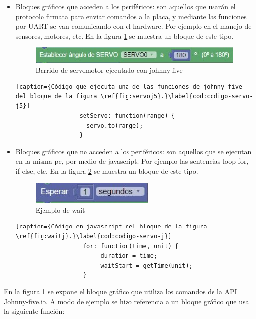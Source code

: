 \begin{itemize}
	\item Bloques gráficos que acceden a los periféricos: son aquellos que usarán el protocolo firmata para enviar comandos a la placa, y mediante las funciones por UART se van comunicando con el hardware. Por ejemplo en el manejo de sensores, motores, etc. En la figura \ref{fig:servoj5} se muestra un bloque de este tipo.
	
	
	\begin{figure}[!htbp]
		\centering
		\includegraphics[width=12cm]{./Figures/ejemplo-servo-j5.PNG}
		\caption{Barrido de servomotor ejecutado con johnny five}
		\label{fig:servoj5}
	\end{figure}
   
    \begin{lstlisting}[caption={Código que ejecuta una de las funciones de johnny five del bloque de la figura \ref{fig:servoj5}.}\label{cod:codigo-servo-j5}] 
                  setServo: function(range) {
                    servo.to(range);
                  }
    \end{lstlisting}
	
	\item Bloques gráficos que no acceden a los periféricos: son aquellos que se ejecutan en la misma pc, por medio de javascript. Por ejemplo las sentencias loop-for, if-else, etc.  En la figura \ref{fig:waitj} se muestra un bloque de este tipo.
	
	\begin{figure}[!htbp]
		\centering
		\includegraphics[width=6cm]{./Figures/ejemplo-servo-j.PNG}
		\caption{Ejemplo de wait}
		\label{fig:waitj}
	\end{figure}

	\begin{lstlisting}[caption={Código en javascript del bloque de la figura \ref{fig:waitj}.}\label{cod:codigo-servo-j}] 
			       for: function(time, unit) {
				        duration = time;
			        	waitStart = getTime(unit);
		           }
	\end{lstlisting}
\end{itemize}

En la figura \ref{fig:servoj5} se expone el bloque gráfico que utiliza los comandos de la API Johnny-five.io. A modo de ejemplo se hizo referencia a un bloque gráfico que usa la siguiente función: 

